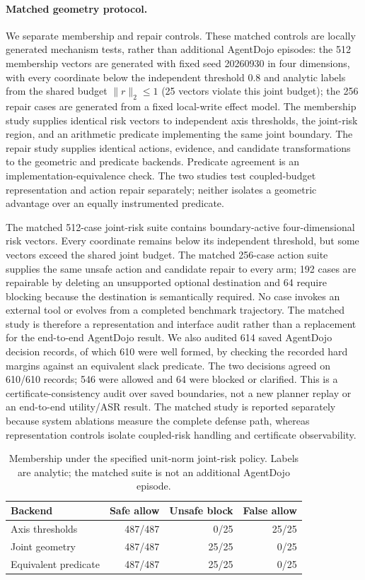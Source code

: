 \documentclass[11pt]{article}
\begin{document}
\paragraph{Matched geometry protocol.}
We separate membership and repair controls. These matched controls are locally generated mechanism tests, rather than additional AgentDojo episodes: the 512 membership vectors are generated with fixed seed 20260930 in four dimensions, with every coordinate below the independent threshold 0.8 and analytic labels from the shared budget $\lVert r\rVert_2\leq1$ (25 vectors violate this joint budget); the 256 repair cases are generated from a fixed local-write effect model. The membership study supplies identical risk vectors to independent axis thresholds, the joint-risk region, and an arithmetic predicate implementing the same joint boundary. The repair study supplies identical actions, evidence, and candidate transformations to the geometric and predicate backends. Predicate agreement is an implementation-equivalence check. The two studies test coupled-budget representation and action repair separately; neither isolates a geometric advantage over an equally instrumented predicate.

The matched 512-case joint-risk suite contains boundary-active four-dimensional risk vectors. Every coordinate remains below its independent threshold, but some vectors exceed the shared joint budget. The matched 256-case action suite supplies the same unsafe action and candidate repair to every arm; 192 cases are repairable by deleting an unsupported optional destination and 64 require blocking because the destination is semantically required. No case invokes an external tool or evolves from a completed benchmark trajectory. The matched study is therefore a representation and interface audit rather than a replacement for the end-to-end AgentDojo result. We also audited 614 saved AgentDojo decision records, of which 610 were well formed, by checking the recorded hard margins against an equivalent slack predicate. The two decisions agreed on 610/610 records; 546 were allowed and 64 were blocked or clarified. This is a certificate-consistency audit over saved boundaries, not a new planner replay or an end-to-end utility/ASR result. The matched study is reported separately because system ablations measure the complete defense path, whereas representation controls isolate coupled-risk handling and certificate observability.

\begin{table}[t]
\centering
\scriptsize
\setlength{\tabcolsep}{3pt}
\begin{tabular}{lrrr}
\toprule
Backend & Safe allow & Unsafe block & False allow\\
\midrule
Axis thresholds & 487/487 & 0/25 & 25/25\\
Joint geometry & 487/487 & 25/25 & 0/25\\
Equivalent predicate & 487/487 & 25/25 & 0/25\\
\bottomrule
\end{tabular}
\caption{Membership under the specified unit-norm joint-risk policy. Labels are analytic; the matched suite is not an additional AgentDojo episode.}
\label{tab:geometry-representation}
\end{table}
\end{document}
